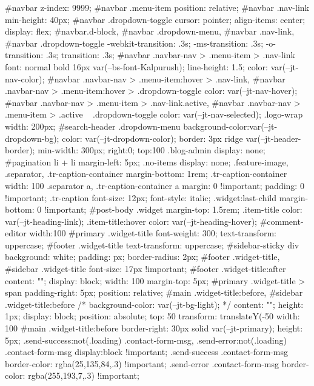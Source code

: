 #navbar {
z-index: 9999;
}
#navbar .menu-item {
position: relative;
}
#navbar .nav-link {
min-height: 40px;
}
#navbar .dropdown-toggle {
cursor: pointer;
align-items: center;
display: flex;
}
#navbar.d-block,
#navbar .dropdown-menu,
#navbar .nav-link,
#navbar .dropdown-toggle {
-webkit-transition: .3s;
-ms-transition: .3s;
-o-transition: .3s;
transition: .3s;
}
#navbar .navbar-nav > .menu-item > .nav-link {
font: normal bold 16px var(--bs-font-Kalpurush);
line-height: 1.5;
color: var(--jt-nav-color);
}
#navbar .navbar-nav > .menu-item:hover > .nav-link,
#navbar .navbar-nav > .menu-item:hover > .dropdown-toggle {
color: var(--jt-nav-hover);
}
#navbar .navbar-nav > .menu-item > .nav-link.active,
#navbar .navbar-nav > .menu-item > .active ~ .dropdown-toggle {
color: var(--jt-nav-selected);
}
.logo-wrap {
width: 200px;
}
#search-header .dropdown-menu {
background-color:var(--jt-dropdown-bg);
color: var(--jt-dropdown-color);
border: 3px ridge var(--jt-header-border);
min-width: 300px;
right:0;
top:100%
}
.blog-admin {
display: none;
}
#pagination li + li {
margin-left: 5px;
}
.no-items {
display: none;
}
.feature-image,
.separator,
.tr-caption-container {
margin-bottom: 1rem;
}
.tr-caption-container {
width: 100%
}
.separator a,
.tr-caption-container a {
margin: 0 !important;
padding: 0 !important;
}
.tr-caption {
font-size: 12px;
font-style: italic;
}
.widget:last-child {
margin-bottom: 0 !important;
}
#post-body .widget {
margin-top: 1.5rem;
}
.item-title {
color: var(--jt-heading-link);
}
.item-title:hover {
color: var(--jt-heading-hover);
}
#comment-editor{
width:100%
}
#primary .widget-title {
font-weight: 300;
text-transform: uppercase;
}
#footer .widget-title {
text-transform: uppercase;
}
#sidebar-sticky div {
background: white;
padding: px;
border-radius: 2px;
}
#footer .widget-title,
#sidebar .widget-title {
font-size: 17px !important;
}
#footer .widget-title:after {
content: "";
display: block;
width: 100%
margin-top: 5px;
}
#primary .widget-title > span {
padding-right: 5px;
position: relative;
}
#main .widget-title:before,
#sidebar .widget-title:before {
/* background-color:  var(--jt-bg-light); */
content: "";
height: 1px;
display: block;
position: absolute;
top: 50%
transform: translateY(-50%
width: 100%
}
#main .widget-title:before {
border-right: 30px solid var(--jt-primary);
height: 5px;
}
.send-success:not(.loading) .contact-form-msg,
.send-error:not(.loading) .contact-form-msg {
display:block !important;
}
.send-success .contact-form-msg{
border-color: rgba(25,135,84,.3) !important;
}
.send-error .contact-form-msg{
border-color: rgba(255,193,7,.3) !important;
}
